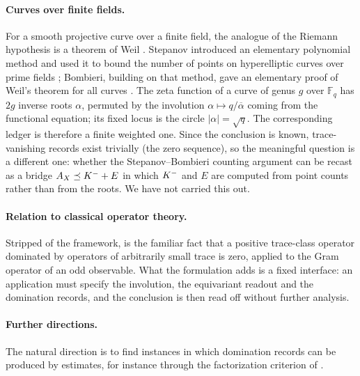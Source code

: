 \paragraph{Curves over finite fields.}
For a smooth projective curve over a finite field, the analogue of the
Riemann hypothesis is a theorem of Weil \citep{Weil1948a,Weil1948b}.
Stepanov introduced an elementary polynomial method and used it to
bound the number of points on hyperelliptic curves over prime fields
\citep{Stepanov1969}; Bombieri, building on that method, gave an
elementary proof of Weil's theorem for all curves \citep{Bombieri1974}.
The zeta function of a curve of genus \(g\) over \(\mathbb F_q\) has
\(2g\) inverse roots \(\alpha\), permuted by the involution
\(\alpha\mapsto q/\overline{\alpha}\) coming from the functional
equation; its fixed locus is the circle \(|\alpha|=\sqrt q\).  The
corresponding ledger is therefore a finite weighted one.  Since the
conclusion is known, trace-vanishing records exist trivially (the zero
sequence), so the meaningful question is a different one: whether the
Stepanov--Bombieri counting argument can be recast as a bridge
\(A_{X}\preceq K^{-}+E\) in which \(K^{-}\) and \(E\) are computed
from point counts rather than from the roots.  We have not carried
this out.

\paragraph{Relation to classical operator theory.}
Stripped of the framework, 
is the familiar fact that a positive trace-class operator dominated by
operators of arbitrarily small trace is zero, applied to the Gram
operator of an odd observable.  What the formulation adds is a fixed
interface: an application must specify the involution, the equivariant
readout and the domination records, and the conclusion is then read
off without further analysis.

\paragraph{Further directions.}
The natural direction is to find instances in which domination
records can be produced by estimates, for instance through the
factorization criterion of .
